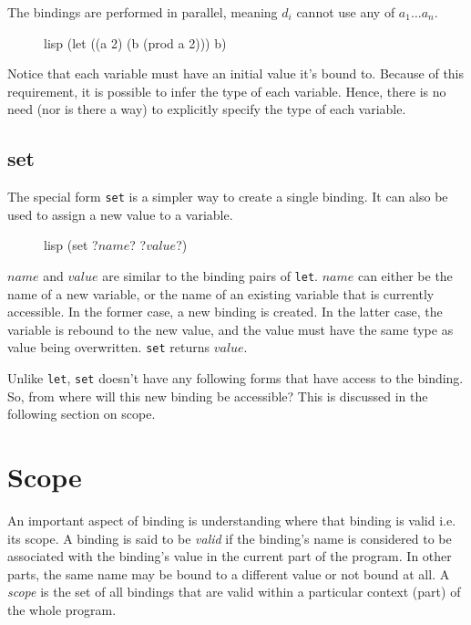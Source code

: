 \documentclass[a4paper, 12pt]{article}
\begin{document}
The bindings are performed in parallel, meaning $d_i$ cannot use any of $a_1 \ldots a_n$.

\begin{figure}[htp]
    \centering
    \begin{cminted}[autogobble=true]{lisp}
        (let ((a 2) (b (prod a 2))) b)
    \end{cminted}
    \captionsetup[figure]{font=small}
\end{figure}

Notice that each variable must have an initial value it's bound to. Because of this requirement, it is possible to infer the type of each variable. Hence, there is no need (nor is there a way) to explicitly specify the type of each variable.

\subsection{set}
The special form \texttt{set} is a simpler way to create a single binding. It can also be used to assign a new value to a variable.

\begin{figure}[htp]
    \centering
    \begin{cminted}[autogobble=true, escapeinside=??]{lisp}
        (set ?$name$? ?$value$?)
    \end{cminted}
    \captionsetup[figure]{font=small}
\end{figure}

$name$ and $value$ are similar to the binding pairs of \texttt{let}. $name$ can either be the name of a new variable, or the name of an existing variable that is currently accessible. In the former case, a new binding is created. In the latter case, the variable is rebound to the new value, and the value must have the same type as value being overwritten. \texttt{set} returns $value$.

Unlike \texttt{let}, \texttt{set} doesn't have any following forms that have access to the binding. So, from where will this new binding be accessible? This is discussed in the following section on scope.

\section{Scope} \label{sec:scope}
An important aspect of binding is understanding where that binding is valid i.e. its scope. A binding is said to be \textit{valid} if the binding's name is considered to be associated with the binding's value in the current part of the program. In other parts, the same name may be bound to a different value or not bound at all. A \textit{scope} is the set of all bindings that are valid within a particular context (part) of the whole program.
\end{document}
